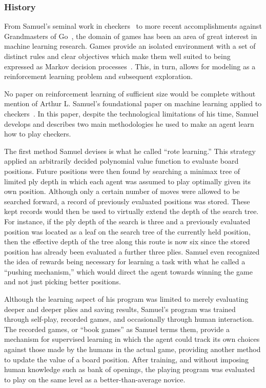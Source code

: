 

\subsubsection*{History}

From Samuel's seminal work in checkers~\cite{samuel_checkers}
to more recent accomplishments against Grandmasters of
Go~\cite{deepmind_alphago},
the domain of games has been an area of great interest in machine learning
research.
%
Games provide an isolated environment with a set of distinct rules and clear
objectives which make them well suited to being expressed as Markov decision
processes~\cite{samuel_checkers}.
%
This, in turn, allows for modeling as a reinforcement learning problem and
subsequent exploration.



No paper on reinforcement learning of sufficient size would be complete without
mention of Arthur L. Samuel's foundational paper on machine learning applied to
checkers~\cite{samuel_checkers}.
%
In this paper,
despite the technological limitations of his time,
Samuel develops and describes two main methodologies he used to make an agent
learn how to play checkers.

The first method Samuel devises is what he called ``rote learning.''
%
This strategy applied an arbitrarily decided polynomial value function
to evaluate board positions.
%
Future positions were then found by searching a minimax tree
of limited ply depth
in which each agent was assumed to play optimally given its own position.
%
Although only a certain number of moves were allowed to be searched forward,
a record of previously evaluated positions was stored.
%
These kept records would then be used to virtually extend the depth of the
search tree.
%
For instance,
if the ply depth of the search is three and a previously evaluated position was
located as a leaf on the search tree of the currently held position,
then the effective depth of the tree along this route is now six since the
stored position has already been evaluated a further three plies.
%
Samuel even recognized the idea of rewards being necessary for learning a task
with what he called a ``pushing mechanism,'' which would direct the agent towards
winning the game and not just picking better positions.

Although the learning aspect of his program was limited to merely evaluating
deeper and deeper plies and saving results,
Samuel's program was trained through self-play, recorded games, and occasionally
through human interaction.
%
The recorded games, or ``book games'' as Samuel terms them,
provide a mechanism for supervised learning in which the agent could track its
own choices against those made by the humans in the actual game,
providing another method to update the value of a board position.
%
After training,
and without imposing human knowledge such as bank of openings,
the playing program was evaluated to play on the same level as a
better-than-average novice.

